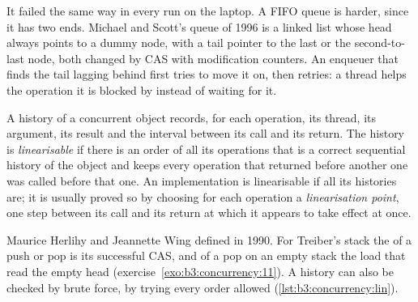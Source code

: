 It failed the same way in every run on the laptop. A  FIFO queue is harder, since it has two ends. Michael and Scott's queue of 1996 %
is a linked list whose head always points to a dummy node, with a tail pointer to the last or the second-to-last node, both changed by CAS with modification counters. %
An enqueuer that finds the tail lagging behind first tries to move it on, then retries: a thread helps the operation it is blocked by instead of waiting for it. %

\begin{definition}\label{def:b3:concurrency:linearisability}
A history of a concurrent object records, for each operation, its thread, its argument, its result and the interval between its call and its return. The history is \emph{linearisable} if there is an order of all its operations that is a correct sequential history of the object and keeps every operation that returned before another one was called before that one. An implementation is linearisable if all its histories are; it is usually proved so by choosing for each operation a \emph{linearisation point}, one step between its call and its return at which it appears to take effect at once.
\end{definition}

Maurice Herlihy and Jeannette Wing defined  in 1990. %
For Treiber's stack the  of a push or pop is its successful CAS, and of a pop on an empty stack the load that read the empty head (exercise~\ref{exo:b3:concurrency:11}). A history can also be checked by brute force, by trying every order allowed (\cref{lst:b3:concurrency:lin}).

\label{lst:b3:concurrency:lin}

\label{out:b3:concurrency:lin}

